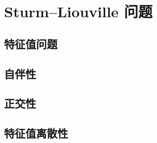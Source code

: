 \section{Sturm–Liouville 问题}
\label{b2:sec:1002}


\subsection{特征值问题}
\label{b2:subsec:100201}

\subsection{自伴性}
\label{b2:subsec:100202}

\subsection{正交性}
\label{b2:subsec:100203}

\subsection{特征值离散性}
\label{b2:subsec:100204}


